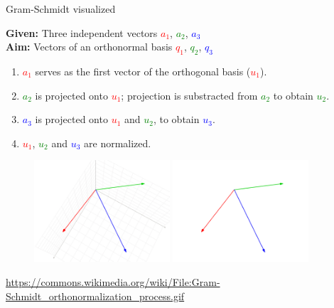 \documentclass[11pt,compress,t,notes=noshow, xcolor=table]{beamer}
\begin{document}
\begin{vbframe}{Gram-Schmidt visualized}
\framebreak

\begin{scriptsize}

\textbf{Given:} Three independent vectors \textcolor{red}{$a_1$}, \textcolor{green}{$a_2$}, \textcolor{blue}{$a_3$} \\
\textbf{Aim:} Vectors of an orthonormal basis \textcolor{red}{$q_1$}, \textcolor{green}{$q_2$}, \textcolor{blue}{$q_3$}

\begin{enumerate}
  \item<2-> \textcolor{red}{$a_1$} serves as the first vector of the orthogonal basis (\textcolor{red}{$u_1$}).
  \item<3-> \textcolor{green}{$a_2$} is projected onto \textcolor{red}{$u_1$}; projection is substracted from \textcolor{green}{$a_2$}
        to obtain \textcolor{green}{$u_2$}.
  \item \textcolor{blue}{$a_3$} is projected onto \textcolor{red}{$u_1$} and \textcolor{green}{$u_2$},
        to obtain \textcolor{blue}{$u_3$}.
  \item<4-> \textcolor{red}{$u_1$}, \textcolor{green}{$u_2$} and \textcolor{blue}{$u_3$} are normalized.
\end{enumerate}

\end{scriptsize}

\begin{figure}
  \centering
  \includegraphics[width=0.45\textwidth]{figure_man/frame_060_delay-2s.png}
  \includegraphics[width=0.45\textwidth]{figure_man/frame_063_delay-1s.png}
\end{figure}
\tiny{\url{https://commons.wikimedia.org/wiki/File:Gram-Schmidt_orthonormalization_process.gif}}


\end{vbframe}
\end{document}

